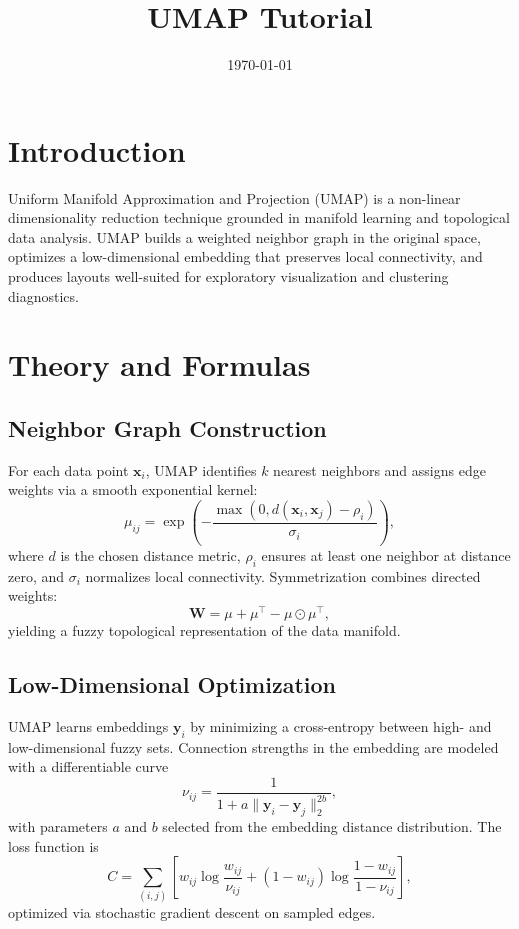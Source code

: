 ﻿\documentclass[12pt]{article}
\title{UMAP Tutorial}
\author{}
\date{\today}
\begin{document}
\maketitle

\section{Introduction}
Uniform Manifold Approximation and Projection (UMAP) is a non-linear dimensionality reduction technique grounded in manifold learning and topological data analysis. UMAP builds a weighted neighbor graph in the original space, optimizes a low-dimensional embedding that preserves local connectivity, and produces layouts well-suited for exploratory visualization and clustering diagnostics.

\section{Theory and Formulas}
\subsection{Neighbor Graph Construction}
For each data point \(\mathbf{x}_i\), UMAP identifies \(k\) nearest neighbors and assigns edge weights via a smooth exponential kernel:
\begin{equation}
\mu_{ij} = \exp\left(-\frac{\max(0, d(\mathbf{x}_i, \mathbf{x}_j) - \rho_i)}{\sigma_i}\right),
\end{equation}
where \(d\) is the chosen distance metric, \(\rho_i\) ensures at least one neighbor at distance zero, and \(\sigma_i\) normalizes local connectivity. Symmetrization combines directed weights:
\begin{equation}
\mathbf{W} = \mu + \mu^{\top} - \mu \odot \mu^{\top},
\end{equation}
yielding a fuzzy topological representation of the data manifold.

\subsection{Low-Dimensional Optimization}
UMAP learns embeddings \(\mathbf{y}_i\) by minimizing a cross-entropy between high- and low-dimensional fuzzy sets. Connection strengths in the embedding are modeled with a differentiable curve
\begin{equation}
\nu_{ij} = \frac{1}{1 + a\lVert \mathbf{y}_i - \mathbf{y}_j \rVert_2^{2b}},
\end{equation}
with parameters \(a\) and \(b\) selected from the embedding distance distribution. The loss function is
\begin{equation}
C = \sum_{(i,j)} \left[ w_{ij} \log \frac{w_{ij}}{\nu_{ij}} + (1 - w_{ij}) \log \frac{1 - w_{ij}}{1 - \nu_{ij}} \right],
\end{equation}
optimized via stochastic gradient descent on sampled edges.
\end{document}
